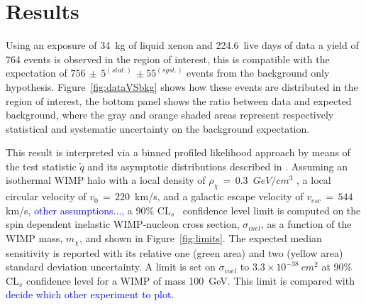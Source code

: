 \section{Results}
Using an exposure of 34~kg of liquid xenon and 224.6~live days of data a yield of 764 events is observed  in the region of interest,
this is compatible with the expectation of $756 \, \pm \, 5^{(stat.)} \, \pm 55^{(syst.)}$ events from the background only hypothesis. 
Figure~\ref{fig:dataVSbkg} shows how these events are distributed in the region of interest, the bottom panel shows the ratio
between data and expected background, where the gray and orange shaded areas represent respectively statistical and systematic uncertainty 
on the background expectation.

This result is interpreted via a binned profiled likelihood approach by means of the test statistic $\tilde{q}$
and its asymptotic distributions described in \cite{asympt}. 
Assuming  an isothermal WIMP halo with a local density of $\rho_{\chi} \, = \, 0.3$~$GeV/cm^3$ , a local circular velocity of $v_0 \,= \, 220$~km/s, and a galactic escape velocity of $v_{esc} \, = \, 544$ km/s, 
\textcolor{blue}{other assumptions...,} a 90\% CL$_s$~\cite{cls} confidence level limit is  
computed on the spin dependent inelastic WIMP-nucleon cross section, $\sigma_{inel}$, as a function of the WIMP mass, $m_{\chi}$, and shown in Figure~\ref{fig:limits}.
The expected median sensitivity is reported with its relative one (green area) and two (yellow area) standard deviation uncertainty.
A  limit is set on $\sigma_{inel}$ to $3.3 \times 10^{-38} ~cm^{2}$ at 90\% CL$_s$ confidence level for a WIMP of mass 100~GeV. This limit is compared with
\textcolor{blue}{decide which other experiment to plot.}


